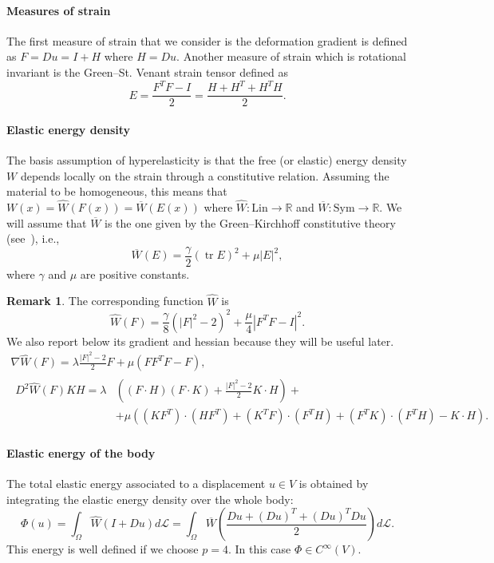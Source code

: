 \documentclass[a4paper,11pt]{article}
\theoremstyle{definition}
\newtheorem{rmk}[prop]{Remark}
\DeclareMathOperator{\tr}{tr}
\begin{document}
\paragraph{Measures of strain} The first measure of strain that we consider is the deformation gradient is defined as $F=Du=I+H$ where $H=Du$. Another measure of strain which is rotational invariant is the Green--St. Venant strain tensor defined as
\[
E=\frac{F^TF-I}{2}=\frac{H+H^T+H^TH}{2}.
\] 

\paragraph{Elastic energy density} The basis assumption of hyperelasticity is that the free (or elastic) energy density $W$ depends locally on the strain through a constitutive relation. Assuming the material to be homogeneous, this means that $W(x)=\hat{W}(F(x))=\overline{W}(E(x))$ where $\hat{W}\colon\text{Lin}\to\mathbb{R}$ and $\overline{W}\colon\text{Sym}\to\mathbb{R}$. We will assume that $\overline{W}$ is the one given by the Green--Kirchhoff constitutive theory (see~\cite{truesdell-noll}), i.e.,
\[
\overline{W}(E)=\frac{\gamma}{2}(\tr E)^2+\mu|E|^2,
\]
where $\gamma$ and $\mu$ are positive constants.

\begin{rmk}
The corresponding function $\hat{W}$ is
\[
\hat{W}(F)=\frac{\gamma}{8}\left(|F|^2-2\right)^2+\frac{\mu}{4}\left|F^TF-I\right|^2.
\]
We also report below its gradient and hessian because they will be useful later.
\begin{gather}
\nabla \hat W(F)=\lambda\frac{|F|^2-2}{2}F+\mu(FF^TF-F),\nonumber\\
\begin{split}
D^2\hat W(F)KH=\lambda&\left((F\cdot H)(F\cdot K)+\frac{|F|^2-2}{2}K\cdot H\right)+\\
&+\mu\left((KF^T)\cdot(HF^T)+(K^TF)\cdot(F^TH)+(F^TK)\cdot(F^TH)-K\cdot H\right).
\label{eqn:D2W}
\end{split}
\end{gather}
\end{rmk}

\paragraph{Elastic energy of the body} The total elastic energy associated to a displacement $u\in V$ is obtained by integrating the elastic energy density over the whole body:
\[
\Phi(u)=\int_\Omega\hat W(I+Du)d\mathscr{L}=\int_\Omega\overline W\left(\frac{Du+(Du)^T+(Du)^TDu}{2}\right)d\mathscr{L}.
\]
This energy is well defined if we choose $p=4$. In this case $\Phi\in C^\infty(V)$.
\end{document}
